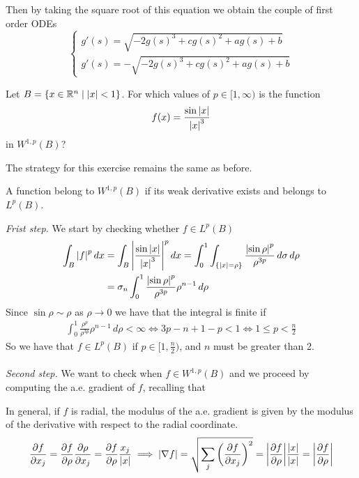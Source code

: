Then by taking the square root of this equation we obtain the couple of first order ODEs
\[
    \begin{cases}
        g'(s) = \sqrt{-2 g(s)^3 + c g(s)^2 + a g(s) + b} \\
        g'(s) = -\sqrt{-2 g(s)^3 + c g(s)^2 + a g(s) + b}
    \end{cases}
\]

\newpage
\begin{exercise}
        Let \(B = \left\{ x \in \mathbb{R}^n \mid \abs{x} < 1 \right\}\). For which values of \(p \in [1, \infty) \) is the function
        \[
            f(x) = \frac{\sin\abs{x}}{\abs{x}^3}
        \]
        in \(W^{1, p}(B)\)?
\end{exercise}
The strategy for this exercise remains the same as before.
\begin{remark}
    A function belong to \(W^{1, p}(B)\) if its weak derivative exists and belongs to \(L^p(B)\).
\end{remark}
\textit{Frist step.} We start by checking whether $f \in L^p(B)$
\[
    \begin{split}
        \int_B \abs{f}^p \, dx &= \int_B \abs{\frac{\sin\abs{x}}{\abs{x}^3}}^p \, dx = \int_0^1 \int_{\left\{\abs{x} = \rho\right\}} \frac{\abs{\sin\rho}^p}{\rho^{3p}} \, d\sigma \, d\rho \\
                               &= \sigma_n \int_0^1 \frac{\abs{\sin\rho}^p}{\rho^{3p}} \rho^{n-1} \, d\rho
    \end{split}
\]
Since $\sin \rho \sim \rho$ as $\rho \rightarrow 0$ we have that the integral is finite if
\[
    \begin{split}
        \int_0^1 \frac{\rho^p}{\rho^{3p}} \rho^{n-1} \, d\rho < \infty \iff 3p - n + 1 - p < 1 \iff 1 \leq p < \frac{n}{2}
    \end{split}
\]
So we have that $f \in L^p(B)$ if $p \in [1, \frac{n}{2})$, and $n$ must be greater than 2. \\
\vspace{0.1cm}\\
\textit{Second step.} We want to check when \(f \in W^{1, p}(B)\) and we proceed by computing the a.e. gradient of \(f\), recalling that
\begin{remark}
In general, if \(f\) is radial, the modulus of the a.e. gradient is given by the modulus of the derivative with respect to the radial coordinate.
\begin{equation*}
\frac{\partial f}{\partial x_j} = \frac{\partial f}{\partial \rho} \frac{\partial \rho}{\partial x_j} = \frac{\partial f}{\partial \rho} \frac{x_j}{\abs{x}}
\implies \abs{\nabla f} = \sqrt{\sum_j \left(\frac{\partial f}{\partial x_j}\right)^2} = \abs{\frac{\partial f}{\partial \rho}} \frac{\abs{x}}{\abs{x}} = \abs{\frac{\partial f}{\partial \rho}}
\end{equation*}
\end{remark}
